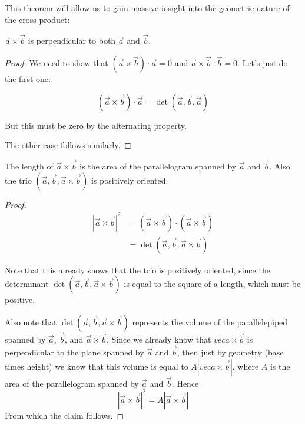 \documentclass{ximera}
\begin{document}
This theorem will allow us to gain massive insight into the geometric nature of the cross product:

\begin{theorem}
  $\vec{a} \times \vec{b}$ is perpendicular to both $\vec{a}$ and $\vec{b}$.
\end{theorem}

\begin{proof}
  We need to show that $(\vec{a} \times \vec{b}) \cdot \vec{a} = 0 $ and $\vec{a} \times \vec{b} \cdot \vec{b} = 0$.  Let's just do the first one:
  
  \[
  (\vec{a} \times \vec{b}) \cdot \vec{a} = \det(\vec{a},\vec{b},\vec{a})
  \]
  
  But this must be zero by the alternating property.
	
  The other case follows similarly.
\end{proof}

\begin{theorem}
  The length of $\vec{a} \times \vec{b}$ is the area of the parallelogram spanned by $\vec{a}$ and $\vec{b}$.  Also the trio $(\vec{a},\vec{b},\vec{a} \times \vec{b})$ is positively oriented.
\end{theorem}

\begin{proof}
  \begin{align*}
    |\vec{a} \times \vec{b}|^2  &=(\vec{a} \times \vec{b}) \cdot (\vec{a} \times \vec{b})\\
    &=\det(\vec{a},\vec{b},\vec{a} \times \vec{b})
  \end{align*}
  
  Note that this already shows that the trio is positively oriented,
  since the determinant $\det(\vec{a},\vec{b},\vec{a} \times \vec{b})$
  is equal to the square of a length, which must be positive.
  
  Also note that $\det(\vec{a},\vec{b},\vec{a} \times \vec{b})$
  represents the volume of the parallelepiped spanned by $\vec{a}$,
  $\vec{b}$, and $\vec{a} \times \vec{b}$.  Since we already know that
  $vec{a} \times \vec{b}$ is perpendicular to the plane spanned by
  $\vec{a}$ and $\vec{b}$, then just by geometry (base times height)
  we know that this volume is equal to $A |vec{a} \times \vec{b}|$,
  where $A$ is the area of the parallelogram spanned by $\vec{a}$ and
  $\vec{b}$.  Hence
  \[
  |\vec{a} \times \vec{b}|^2 = A |\vec{a} \times \vec{b}|
  \]
  From which the claim follows.
\end{proof}
\end{document}
